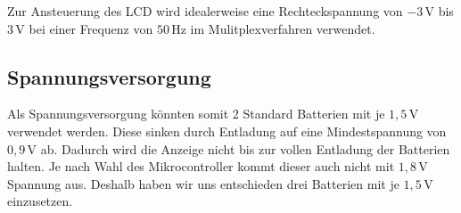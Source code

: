 

Zur Ansteuerung des LCD wird idealerweise eine Rechteckspannung von \(-3\,\textrm{V}\) bis \(3\,\textrm{V}\) bei einer Frequenz von \(50\,\textrm{Hz}\) im Mulitplexverfahren verwendet.


\subsection{Spannungsversorgung}
Als Spannungsversorgung könnten somit 2 Standard Batterien mit je \(1,5\,\textrm{V}\) verwendet werden. Diese sinken durch Entladung auf eine Mindestspannung von \(0,9\,\textrm{V}\) ab. Dadurch wird die Anzeige nicht bis zur vollen Entladung der Batterien halten. Je nach Wahl des Mikrocontroller kommt dieser auch nicht mit \(1,8\,\textrm{V}\) Spannung aus. Deshalb haben wir uns entschieden drei Batterien mit je \(1,5\,\textrm{V}\) einzusetzen.

